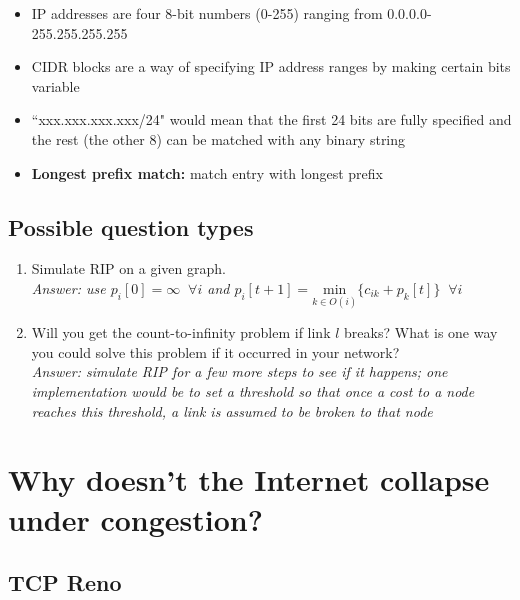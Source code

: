 \documentclass{article}
\begin{document}
\begin{itemize}
\item IP addresses are four 8-bit numbers (0-255) ranging from 0.0.0.0-255.255.255.255 \\
\item CIDR blocks are a way of specifying IP address ranges by making certain bits variable \\
\item ``xxx.xxx.xxx.xxx/24" would mean that the first 24 bits are fully specified and the rest (the other 8) can be matched with any binary string \\
\item \textbf{Longest prefix match:} match entry with longest prefix
\end{itemize}

\subsection{Possible question types}

\begin{enumerate}
\item Simulate RIP on a given graph. \\
\textit{Answer: use $p_i[0] = \infty \; \; \forall i$ and $p_i[t + 1] = \underset{k \in O(i)}{\text{min}} \lbrace c_{ik} + p_k[t] \rbrace \; \; \forall i$ }
\item Will you get the count-to-infinity problem if link $l$ breaks? What is one way you could solve this problem if it occurred in your network? \\
\textit{Answer: simulate RIP for a few more steps to see if it happens; one implementation would be to set a threshold so that once a cost to a node reaches this threshold, a link is assumed to be broken to that node}
\end{enumerate}

\section{Why doesn't the Internet collapse under congestion?}

\subsection{TCP Reno}
\end{document}
